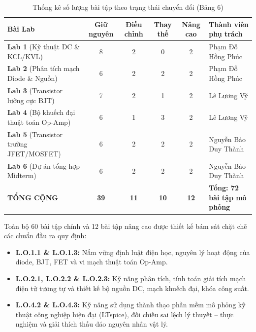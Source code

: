 \documentclass[12pt,a4paper]{report}
\begin{document}
\begin{table}[H]
\centering
\caption{Thống kê số lượng bài tập theo trạng thái chuyển đổi (Bảng 6)}
\label{tab:thong_ke_trang_thai}
\renewcommand{\arraystretch}{1.3}
\begin{tabularx}{\textwidth}{|l|c|c|c|c|X|}
\hline
\rowcolor{codebg}
\textbf{Bài Lab} & \textbf{Giữ nguyên} & \textbf{Điều chỉnh} & \textbf{Thay thế} & \textbf{Nâng cao} & \textbf{Thành viên phụ trách} \\ \hline
\textbf{Lab 1} (Kỹ thuật DC \& KCL/KVL) & 8 & 2 & 0 & 2 & Phạm Đỗ Hồng Phúc \\ \hline
\textbf{Lab 2} (Phân tích mạch Diode \& Nguồn) & 6 & 2 & 2 & 2 & Phạm Đỗ Hồng Phúc \\ \hline
\textbf{Lab 3} (Transistor lưỡng cực BJT) & 7 & 2 & 1 & 2 & Lê Lương Vỹ \\ \hline
\textbf{Lab 4} (Bộ khuếch đại thuật toán Op-Amp) & 6 & 1 & 3 & 2 & Lê Lương Vỹ \\ \hline
\textbf{Lab 5} (Transistor trường JFET/MOSFET) & 6 & 2 & 2 & 2 & Nguyễn Bảo Duy Thành \\ \hline
\textbf{Lab 6} (Dự án tổng hợp Midterm) & 6 & 2 & 2 & 2 & Nguyễn Bảo Duy Thành \\ \hline
\hline
\rowcolor{codebg}
\textbf{TỔNG CỘNG} & \textbf{39} & \textbf{11} & \textbf{10} & \textbf{12} & \textbf{Tổng: 72 bài tập mô phỏng} \\ \hline
\end{tabularx}
\end{table}

\begin{tcolorbox}[colback=codebg,colframe=bkblue,title=\textbf{Đảm bảo Chuẩn đầu ra Môn học (Course Learning Outcomes)}]
Toàn bộ 60 bài tập chính và 12 bài tập nâng cao được thiết kế bám sát chặt chẽ các chuẩn đầu ra quy định:
\begin{itemize}[noitemsep]
    \item \textbf{L.O.1.1 \& L.O.1.3:} Nắm vững định luật điện học, nguyên lý hoạt động của diode, BJT, FET và vi mạch thuật toán Op-Amp.
    \item \textbf{L.O.2.1, L.O.2.2 \& L.O.2.3:} Kỹ năng phân tích, tính toán giải tích mạch điện tử tương tự và thiết kế bộ nguồn DC, mạch khuếch đại, khóa công suất.
    \item \textbf{L.O.4.2 \& L.O.4.3:} Kỹ năng sử dụng thành thạo phần mềm mô phỏng kỹ thuật công nghiệp hiện đại (LTspice), đối chiếu sai lệch lý thuyết -- thực nghiệm và giải thích thấu đáo nguyên nhân vật lý.
\end{itemize}
\end{tcolorbox}
\end{document}
